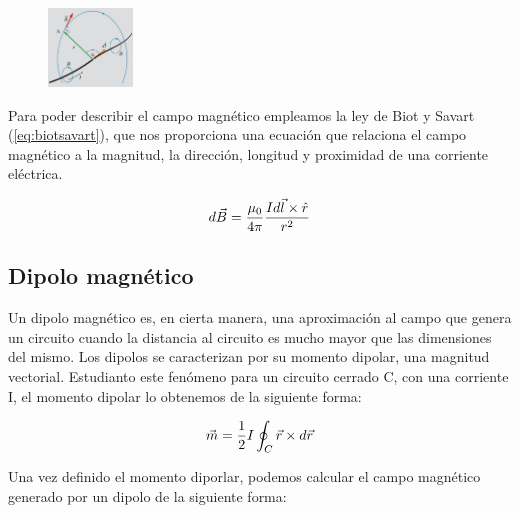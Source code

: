 \documentclass[11pt]{article}
\begin{document}
        \begin{figure}
            \vspace{-0.44cm}
            \centering
            \includegraphics[width=0.2\textwidth]{Captura2.PNG}
        \end{figure}

        \vspace{0.4cm}Para poder describir el campo magnético empleamos la ley de Biot y Savart (\ref{eq:biotsavart}), que nos proporciona una ecuación que relaciona el campo magnético a la magnitud, la dirección, longitud y proximidad de una corriente eléctrica.

        \begin{equation}
            \centering
                d\vec{B}=\frac{\mu _{0}}{4\pi}\frac{Id\vec{l}\times\hat{r}}{r^{2}}
            \label{eq:biotsavart}
        \end{equation}

        \vspace{0.1cm}
        \subsection{Dipolo magnético}
        Un dipolo magnético es, en cierta manera, una aproximación al campo que genera un circuito cuando la distancia al circuito es mucho mayor que las dimensiones del mismo. 
        \vspace{5mm}
        \newline Los dipolos se caracterizan por su momento dipolar, una magnitud vectorial. Estudianto este fenómeno para un circuito cerrado C, con una corriente I, el momento dipolar lo obtenemos de la siguiente forma:

        \vspace{-0.25cm}
        \begin{equation}
            \centering
                \vec{m}=\frac{1}{2}I\oint_{C}\vec{r}\times d\vec{r}
            \label{eq:dipolo}
        \end{equation}

        \vspace{0.4cm}Una vez definido el momento diporlar, podemos calcular el campo magnético generado por un dipolo de la siguiente forma:
\end{document}
